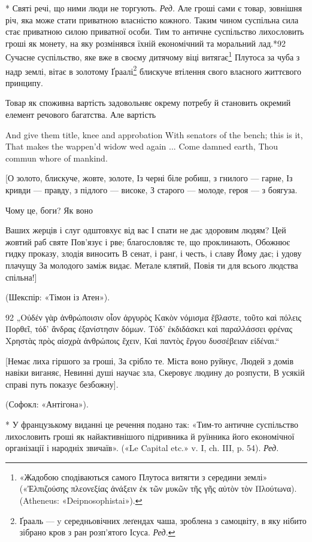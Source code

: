 * Святі речі, що ними люди не торгують. \emph{Ред.}
Але гроші сами є товар, зовнішня річ, яка може стати приватною
власністю кожного. Таким чином суспільна сила стає приватною
силою приватної особи. Тим то античне суспільство лихословить
гроші як монету, на яку розмінявся їхній економічний та моральний
лад.*92 Сучасне суспільство, яке вже в своєму дитячому
віці витягає\footnote{
«Жадобою сподіваються самого Плутоса витягти з середини землі»
(«Ἐλπιζούσης  πλεονεξίας ἀνάξειν ἐκ τῶν μυκῶν τῆς γῆς αὐτὸν τὸν Πλούτωνα). (Atheneus:
«Deipnosophistai»).
} Плутоса за чуба з надр землі, вітає в золотому
Ґраалі\footnote*{
Ґрааль — y середньовічних леґендах чаша, зроблена з самоцвіту,
в яку нібито зібрано кров з ран розп’ятого Ісуса. \emph{Ред.}
} блискуче втілення свого власного життєвого принципу.

Товар як споживна вартість задовольняє окрему потребу й
становить окремий елемент речового багатства. Але вартість

And give them title, knee and approbation
With senators of the bench; this is it,
That makes the wappen’d widow wed again
... Come damned earth,
Thou commun whore of mankind.

[О золото, блискуче, жовте, золоте,
Із черні біле робиш, з гнилого — гарне,
Із кривди — правду, з підлого — високе,
З старого — молоде, героя — з боягуза.

Чому це, боги? Як воно

Ваших жерців і слуг одштовхує від вас
І спати не дає здоровим людям?
Цей жовтий раб святе
Пов’язує і рве; благословляє те, що
проклинають,
Обожнює гидку проказу, злодія виносить
В сенат, і ранґ, і честь, і славу
Йому дає; і удову плачущу
За молодого заміж видає.
Метале клятий,
Повія ти для всього людства спільна!]

(Шекспір: «Тімон із Атен»).

92 „Οὐδέν γὰρ ἀνθρώποισιν οἷον ἀργυρὸς
Κακὸν νόμισμα ἔβλαστε, τοῦτο καὶ πόλεις
Πορθεῖ, τόδ’ ἄνδρας ἐξανίστησιν δόμων.
Τόδ’ ἐκδιδάσκει καὶ παραλλάσσει φρένας
Χρηστὰς πρὸς αἰσχρὰ ἀνθρώποις ἔχειν,
Καὶ παντὸς ἔργου δυσσέβειαν εἰδέναι.“

[Немає лиха гіршого за гроші,
За срібло те. Міста воно руйнує,
Людей з домів навіки виганяє,
Невинні душі научає зла,
Скеровує людину до розпусти,
В усякій справі путь показує безбожну].

(Софокл: «Антігона»).

* У французькому виданні це речення подано так: «Тим-то
античне
суспільство лихословить гроші як найактивнішого підривника й руїнника
його економічної організації і народніх звичаїв». («Le Capital etc.» v. I,
ch. III, p. 54). \emph{Ред.}
\parbreak{}  %
